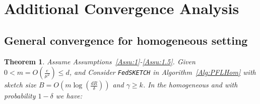 \documentclass[twoside]{article}
\newtheorem{theorem}{Theorem}
\begin{document}
\section{Additional Convergence Analysis}\label{sec:gen-proof}
\subsection{General convergence for homogeneous setting}\label{sec:gen-proof-hom}
\begin{theorem}\label{thm:homog_casee}
Assume Assumptions~\ref{Assu:1}-\ref{Assu:1.5}. Given $0<m=O\left(\frac{e}{\mu^2}\right)\leq d$, and Consider \texttt{FedSKETCH} in Algorithm~\ref{Alg:PFLHom} with sketch size $B=O\left(m\log\left(\frac{d R}{\delta}\right)\right)$ and $\gamma\geq k$. In the homogeneous and with probability $1-\delta$ we have:

 

 



\end{theorem}
\end{document}

